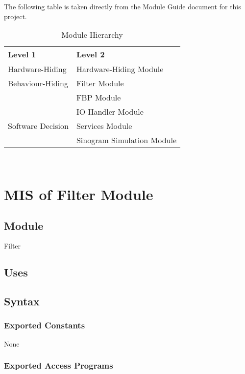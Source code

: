 \documentclass[12pt, titlepage]{article}
\begin{document}
The following table is taken directly from the Module Guide document for this project.

\begin{table}[h!]
\centering
\begin{tabular}{p{} p{}}
\toprule
\textbf{Level 1} & \textbf{Level 2}\\
\midrule

{Hardware-Hiding} & Hardware-Hiding Module \\
\midrule

{Behaviour-Hiding}
& Filter Module\\
& FBP Module\\
& IO Handler Module\\
\midrule

{Software Decision} & Services Module\\
& Sinogram Simulation Module\\
\bottomrule

\end{tabular}
\caption{Module Hierarchy}
\label{TblMH}
\end{table}

\newpage
~\newpage

\section{MIS of Filter Module} \label{ModuleF}

\subsection{Module}
Filter

\subsection{Uses}

\subsection{Syntax}

\subsubsection{Exported Constants}
None

\subsubsection{Exported Access Programs}
\end{document}

